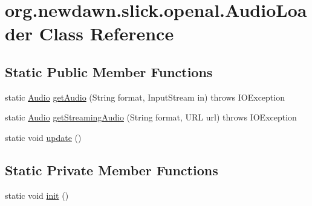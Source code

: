 \hypertarget{classorg_1_1newdawn_1_1slick_1_1openal_1_1_audio_loader}{}\section{org.\+newdawn.\+slick.\+openal.\+Audio\+Loader Class Reference}
\label{classorg_1_1newdawn_1_1slick_1_1openal_1_1_audio_loader}
\subsection*{Static Public Member Functions}
\begin{DoxyCompactItemize}
\item 
static \mbox{\hyperlink{interfaceorg_1_1newdawn_1_1slick_1_1openal_1_1_audio}{Audio}} \mbox{\hyperlink{classorg_1_1newdawn_1_1slick_1_1openal_1_1_audio_loader_a122ea3006a94beb60a54c57d8c36520c}{get\+Audio}} (String format, Input\+Stream in)  throws I\+O\+Exception 
\item 
static \mbox{\hyperlink{interfaceorg_1_1newdawn_1_1slick_1_1openal_1_1_audio}{Audio}} \mbox{\hyperlink{classorg_1_1newdawn_1_1slick_1_1openal_1_1_audio_loader_aa74731b7521ad2ee66779ff471d85d2b}{get\+Streaming\+Audio}} (String format, U\+RL url)  throws I\+O\+Exception 
\item 
static void \mbox{\hyperlink{classorg_1_1newdawn_1_1slick_1_1openal_1_1_audio_loader_ad0f82b81a9441b1b2bd432ec648dfed1}{update}} ()
\end{DoxyCompactItemize}
\subsection*{Static Private Member Functions}
\begin{DoxyCompactItemize}
\item 
static void \mbox{\hyperlink{classorg_1_1newdawn_1_1slick_1_1openal_1_1_audio_loader_ad2d2f4bb59fef206981fbe0896ecc87c}{init}} ()
\end{DoxyCompactItemize}
